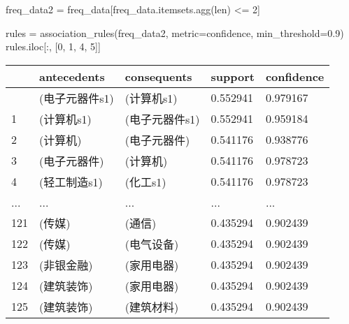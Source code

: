 \documentclass[
  letterpaper,
  DIV=11,
  numbers=noendperiod]{scrreprt}
\newenvironment{Shaded}{\begin{snugshade}}{\end{snugshade}}
\newcommand{\BuiltInTok}[1]{\textcolor[rgb]{0.00,0.23,0.31}{#1}}
\newcommand{\DecValTok}[1]{\textcolor[rgb]{0.68,0.00,0.00}{#1}}
\newcommand{\FloatTok}[1]{\textcolor[rgb]{0.68,0.00,0.00}{#1}}
\newcommand{\NormalTok}[1]{\textcolor[rgb]{0.00,0.23,0.31}{#1}}
\newcommand{\OperatorTok}[1]{\textcolor[rgb]{0.37,0.37,0.37}{#1}}
\newcommand{\StringTok}[1]{\textcolor[rgb]{0.13,0.47,0.30}{#1}}
\begin{document}
\begin{Shaded}
\begin{Highlighting}[]
\NormalTok{freq\_data2 }\OperatorTok{=}\NormalTok{ freq\_data[freq\_data.itemsets.agg(}\BuiltInTok{len}\NormalTok{) }\OperatorTok{\textless{}=} \DecValTok{2}\NormalTok{]}
\end{Highlighting}
\end{Shaded}

\begin{Shaded}
\begin{Highlighting}[]
\NormalTok{rules }\OperatorTok{=}\NormalTok{ association\_rules(freq\_data2, metric}\OperatorTok{=}\StringTok{\textquotesingle{}confidence\textquotesingle{}}\NormalTok{, min\_threshold}\OperatorTok{=}\FloatTok{0.9}\NormalTok{)}
\NormalTok{rules.iloc[:, [}\DecValTok{0}\NormalTok{, }\DecValTok{1}\NormalTok{, }\DecValTok{4}\NormalTok{, }\DecValTok{5}\NormalTok{]]}
\end{Highlighting}
\end{Shaded}

\begin{longtable}[]{@{}lllll@{}}
\toprule\noalign{}
& antecedents & consequents & support & confidence \\
\midrule\noalign{}
\endhead
\bottomrule\noalign{}
\endlastfoot
0 & (电子元器件s1) & (计算机s1) & 0.552941 & 0.979167 \\
1 & (计算机s1) & (电子元器件s1) & 0.552941 & 0.959184 \\
2 & (计算机) & (电子元器件) & 0.541176 & 0.938776 \\
3 & (电子元器件) & (计算机) & 0.541176 & 0.978723 \\
4 & (轻工制造s1) & (化工s1) & 0.541176 & 0.978723 \\
... & ... & ... & ... & ... \\
121 & (传媒) & (通信) & 0.435294 & 0.902439 \\
122 & (传媒) & (电气设备) & 0.435294 & 0.902439 \\
123 & (非银金融) & (家用电器) & 0.435294 & 0.902439 \\
124 & (建筑装饰) & (家用电器) & 0.435294 & 0.902439 \\
125 & (建筑装饰) & (建筑材料) & 0.435294 & 0.902439 \\
\end{longtable}
\end{document}
